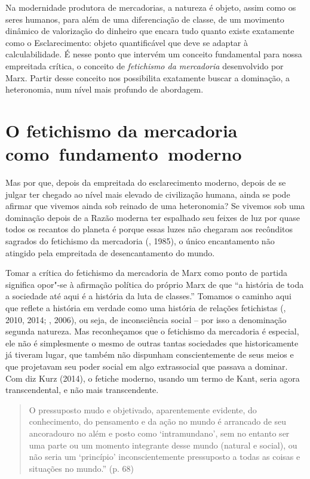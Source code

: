 Na modernidade produtora de mercadorias, a natureza é objeto, assim como
os seres humanos, para além de uma diferenciação de classe, de um
movimento dinâmico de valorização do dinheiro que encara tudo quanto
existe exatamente como o Esclarecimento: objeto quantificável que deve
se adaptar à calculabilidade. É nesse ponto que intervém um conceito
fundamental para nossa empreitada crítica, o conceito de
\emph{fetichismo da mercadoria} desenvolvido por Marx. Partir desse
conceito nos possibilita exatamente buscar a dominação, a heteronomia,
num nível mais profundo de abordagem.

\section*{O fetichismo da mercadoria como~fundamento~moderno}

Mas por que, depois da empreitada do esclarecimento moderno, depois de
se julgar ter chegado ao nível mais elevado de civilização humana, ainda
se pode afirmar que vivemos ainda sob reinado de uma heteronomia? Se
vivemos sob uma dominação depois de a Razão moderna ter espalhado seu
feixes de luz por quase todos os recantos do planeta é porque essas
luzes não chegaram aos recônditos sagrados do fetichismo da mercadoria
(, 1985), o único encantamento não atingido pela empreitada de
desencantamento do mundo.

Tomar a crítica do fetichismo da mercadoria de Marx como ponto de
partida significa opor"-se à afirmação política do próprio Marx de que
``a história de toda a sociedade até aqui é a história da luta de
classes.'' Tomamos o caminho aqui que reflete a história em verdade como
uma história de relações fetichistas (, 2010, 2014; , 2006), ou
seja, de inconsciência social -- por isso a denominação segunda
natureza. Mas reconheçamos que o fetichismo da mercadoria é especial,
ele não é simplesmente o mesmo de outras tantas sociedades que
historicamente já tiveram lugar, que também não dispunham
conscientemente de seus meios e que projetavam seu poder social em algo
extrassocial que passava a dominar. Com diz Kurz (2014), o fetiche
moderno, usando um termo de Kant, seria agora transcendental, e não mais
transcendente.

\begin{quote}
O pressuposto mudo e objetivado, aparentemente evidente, do
conhecimento, do pensamento e da ação no mundo é arrancado de seu
ancoradouro no além e posto como `intramundano', sem no entanto ser uma
parte ou um momento integrante desse mundo (natural e social), ou não
seria um `princípio' inconscientemente pressuposto a todas as coisas e
situações no mundo.'' (p. 68)
\end{quote}

